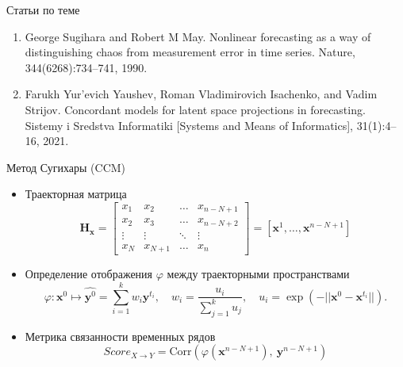 \documentclass{beamer}
\newcommand{\bx}{\mathbf{x}}
\newcommand{\by}{\mathbf{y}}
\newcommand{\bz}{\mathbf{z}}
\newcommand{\dH}{\mathds{H}}
\begin{document}
	\begin{frame}{Статьи по теме}
		\begin{enumerate}
			\item George Sugihara and Robert M May. Nonlinear forecasting as a way of distinguishing
			chaos from measurement error in time series. Nature, 344(6268):734–741, 1990.
			\item Farukh Yur’evich Yaushev, Roman Vladimirovich Isachenko, and Vadim Strijov.
			Concordant models for latent space projections in forecasting. Sistemy i Sredstva
			Informatiki [Systems and Means of Informatics], 31(1):4–16, 2021.
		\end{enumerate}
	\end{frame}

	\begin{frame}{Метод Сугихары (CCM)}
		\begin{itemize}
			\item[] Траекторная матрица
			\[ \textbf{H}_{\bx} = \begin{bmatrix}
				x_1 & x_2 & \ldots & x_{n-N+1} \\
				x_2 & x_3 & \ldots & x_{n-N+2} \\
				\vdots & \vdots & \ddots & \vdots \\
				x_{N} & x_{N+1} & \ldots & x_n
			\end{bmatrix} = [\bx^1, \ldots, \bx^{n-N+1}] \]
		
			\item[] Определение отображения $\varphi$ между траекторными пространствами
			\[ \varphi: \bx^0 \mapsto \widehat{\by^0} = \sum\limits_{i=1}^k w_i \by^{t_i}, \quad 
			w_i = \dfrac{u_i}{\sum\limits_{j=1}^k u_j}, \quad
			u_i = \exp(-||\bx^0 - \bx^{t_i}||). \]
			
			
			\item[] Метрика связанности временных рядов
			\[ Score_{X \rightarrow Y} = \text{Corr}(\varphi(\bx^{n-N+1}), \: \by^{n-N+1}) \]
		\end{itemize}
	\end{frame}
\end{document}

